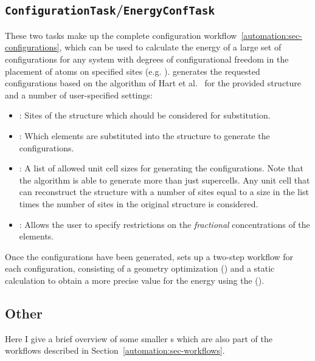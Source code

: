 \begin{refsection}
\subsection{\texttt{ConfigurationTask}/\texttt{EnergyConfTask}} 
\label{automation:sec-ConfigurationTask} \label{automation:sec-EnergyConfTask} 
 
These two tasks make up the complete configuration 
workflow~\ref{automation:sec-configurations}, which can be used to calculate the 
energy of a large set of configurations for any system with degrees of configurational 
freedom in the placement of atoms on specified sites (e.g. 
).
 generates the requested configurations based on the 
algorithm of Hart et al.~\cite{Hart2005} for the provided structure and a 
number of user-specified settings: 
 
\begin{itemize} 
\item {}: Sites of the structure which should 
be considered for substitution. 
\item {}: Which elements are substituted into the 
structure to generate the configurations. 
\item {} : A list of allowed unit cell sizes for generating 
the configurations. Note that the algorithm is able to generate more than just 
supercells. Any unit cell that can reconstruct the structure with a number of 
sites equal to a size in the list times the number of sites in the original 
structure is considered. 
\item {}: Allows the user to specify 
restrictions on the \textit{fractional} concentrations of the elements. 
\end{itemize} 
 
Once the configurations have been generated,  sets up a 
two-step workflow for each configuration, consisting of a geometry 
optimization () and a static calculation to obtain a more 
precise value for the energy using the  (). 
 
\subsection{Other} 
 
Here I give a brief overview of some smaller s which are also 
part of the workflows described in Section~\ref{automation:sec-workflows}.  
 

\end{refsection}
